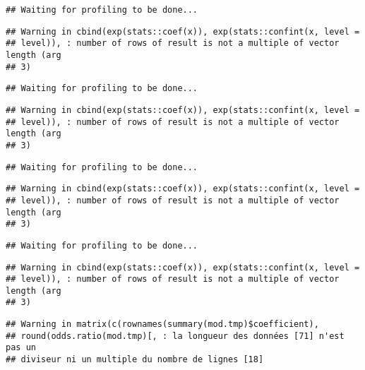 \documentclass[]{article}
\newenvironment{Shaded}{\begin{snugshade}}{\end{snugshade}}
\newcommand{\KeywordTok}[1]{\textcolor[rgb]{0.13,0.29,0.53}{\textbf{#1}}}
\newcommand{\DataTypeTok}[1]{\textcolor[rgb]{0.13,0.29,0.53}{#1}}
\newcommand{\StringTok}[1]{\textcolor[rgb]{0.31,0.60,0.02}{#1}}
\newcommand{\OperatorTok}[1]{\textcolor[rgb]{0.81,0.36,0.00}{\textbf{#1}}}
\newcommand{\NormalTok}[1]{#1}
\begin{document}
\begin{verbatim}
## Waiting for profiling to be done...
\end{verbatim}

\begin{verbatim}
## Warning in cbind(exp(stats::coef(x)), exp(stats::confint(x, level =
## level)), : number of rows of result is not a multiple of vector length (arg
## 3)
\end{verbatim}

\begin{verbatim}
## Waiting for profiling to be done...
\end{verbatim}

\begin{verbatim}
## Warning in cbind(exp(stats::coef(x)), exp(stats::confint(x, level =
## level)), : number of rows of result is not a multiple of vector length (arg
## 3)
\end{verbatim}

\begin{verbatim}
## Waiting for profiling to be done...
\end{verbatim}

\begin{verbatim}
## Warning in cbind(exp(stats::coef(x)), exp(stats::confint(x, level =
## level)), : number of rows of result is not a multiple of vector length (arg
## 3)
\end{verbatim}

\begin{verbatim}
## Waiting for profiling to be done...
\end{verbatim}

\begin{verbatim}
## Warning in cbind(exp(stats::coef(x)), exp(stats::confint(x, level =
## level)), : number of rows of result is not a multiple of vector length (arg
## 3)
\end{verbatim}

\begin{verbatim}
## Warning in matrix(c(rownames(summary(mod.tmp)$coefficient),
## round(odds.ratio(mod.tmp)[, : la longueur des données [71] n'est pas un
## diviseur ni un multiple du nombre de lignes [18]
\end{verbatim}

\begin{Shaded}
\end{Shaded}
\end{document}
